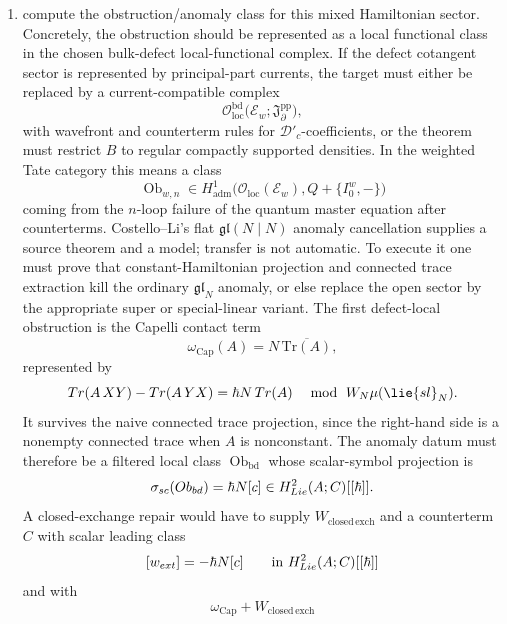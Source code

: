 \documentclass[11pt]{memoir}
\begin{document}
\begin{prob}
\begin{enumerate}
      used only after the zero modes and harmonic projection have been fixed;
	    \item compute the obstruction/anomaly class for this mixed Hamiltonian
	      sector. Concretely, the obstruction should be represented as a local
	      functional class in the chosen bulk-defect local-functional complex. If
	      the defect cotangent sector is represented by principal-part currents,
	      the target must either be replaced by a current-compatible complex
	      \[
	        \mathcal O_{\mathrm{loc}}^{\mathrm{bd}}\bigl(
	          \mathcal E_w;\mathfrak J_{\partial}^{\mathrm{pp}}\bigr),
	      \]
	      with wavefront and counterterm rules for \(\mathcal D'_c\)-coefficients,
	      or the theorem must restrict \(B\) to regular compactly supported
	      densities. In
	      the weighted Tate category this means a class
	      \[
	        \operatorname{Ob}_{w,n}\in
	        H^1_{\mathrm{adm}}\bigl(\mathcal O_{\mathrm{loc}}(\mathcal E_w),
	          Q+\{I_0^w,-\}\bigr)
	      \]
	      coming from the $n$-loop failure of the quantum master equation after
	      counterterms. Costello--Li's flat $\mathfrak{gl}(N\mid N)$ anomaly
      cancellation supplies a source theorem and a model; transfer is not
      automatic. To execute it one must prove that constant-Hamiltonian
      projection and connected trace extraction kill the ordinary
      $\mathfrak{gl}_N$ anomaly, or else replace the open sector by the
      appropriate super or special-linear variant. The
      first defect-local obstruction is the
      Capelli contact term
      $$\omega_{\mathrm{Cap}}(A)=N\,\overline{\mathrm{Tr}(A)},$$
      represented by
      $$\mathrm{Tr}(A\,XY)-\mathrm{Tr}(A\,YX)
        =\hbar N\,\mathrm{Tr}(A)
        \quad\bmod\ \mathcal W_N\widehat\mu(\lie{sl}_N).$$
	      It survives the naive connected trace projection, since the
	      right-hand side is a nonempty connected trace when $A$ is nonconstant.
	      The anomaly datum must therefore be a filtered local class
	      \(\operatorname{Ob}_{\mathrm{bd}}\) whose scalar-symbol projection is
	      \[
	        \sigma_{sc}(Ob_{bd})
	          =\hbar N[c]\in
	            H^2_{Lie}(A;C)[[\hbar]] .
	      \]
	      A closed-exchange repair would have to supply
	      \(W_{\mathrm{closed\,exch}}\) and a counterterm \(C\) with scalar
	      leading class
	      \[
	        [w_{ext}]=-\hbar N[c]
	        \qquad\text{in }H^2_{Lie}(A;C)[[\hbar]]
	      \]
	      and with
	      $$\omega_{\mathrm{Cap}}+W_{\mathrm{closed\,exch}}
$$
\end{enumerate}
\end{prob}
\end{document}

